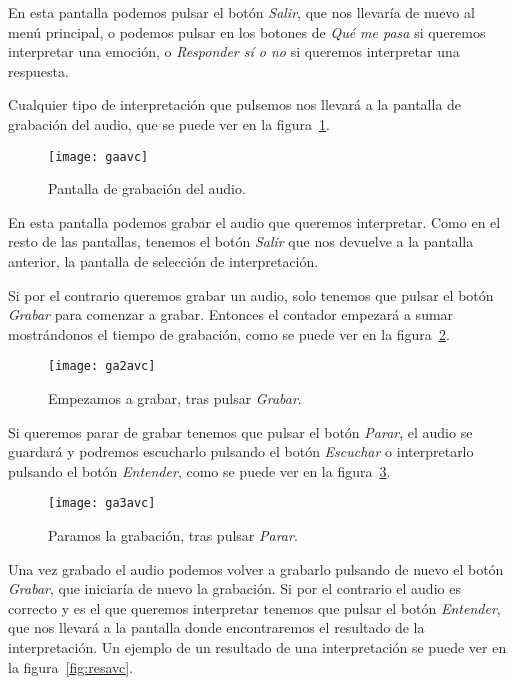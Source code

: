 En esta pantalla podemos pulsar el botón \textit{Salir}, que nos llevaría de nuevo al menú principal, o podemos pulsar en los botones de \textit{Qué me pasa} si queremos interpretar una emoción, o \textit{Responder sí o no} si queremos interpretar una respuesta.

Cualquier tipo de interpretación que pulsemos nos llevará a la pantalla de grabación del audio, que se puede ver en la figura~\ref{fig:gaavc}.

\begin{figure}[htp]
	\centering
	\texttt{[image: gaavc]}
	\caption{Pantalla de grabación del audio.}
	\label{fig:gaavc}
\end{figure}

En esta pantalla podemos grabar el audio que queremos interpretar. Como en el resto de las pantallas, tenemos el botón \textit{Salir} que nos devuelve a la pantalla anterior, la pantalla de selección de interpretación.

Si por el contrario queremos grabar un audio, solo tenemos que pulsar el botón \textit{Grabar} para comenzar a grabar. Entonces el contador empezará a sumar mostrándonos el tiempo de grabación, como se puede ver en la figura~\ref{fig:ga2avc}.

\begin{figure}[htp]
	\centering
	\texttt{[image: ga2avc]}
	\caption{Empezamos a grabar, tras pulsar \textit{Grabar}.}
	\label{fig:ga2avc}
\end{figure}

Si queremos parar de grabar tenemos que pulsar el botón \textit{Parar}, el audio se guardará y podremos escucharlo pulsando el botón \textit{Escuchar} o interpretarlo pulsando el botón \textit{Entender}, como se puede ver en la figura~\ref{fig:ga3avc}.

\begin{figure}[htp]
	\centering
	\texttt{[image: ga3avc]}
	\caption{Paramos la grabación, tras pulsar \textit{Parar}.}
	\label{fig:ga3avc}
\end{figure}

Una vez grabado el audio podemos volver a grabarlo pulsando de nuevo el botón \textit{Grabar}, que iniciaría de nuevo la grabación. Si por el contrario el audio es correcto y es el que queremos interpretar tenemos que pulsar el botón \textit{Entender}, que nos llevará a la pantalla donde encontraremos el resultado de la interpretación. Un ejemplo de un resultado de una interpretación se puede ver en la figura~\ref{fig:resavc}.

